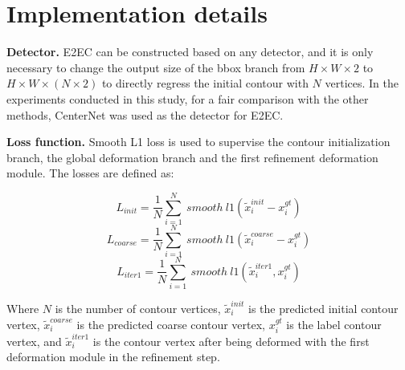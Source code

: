 \documentclass[10pt,twocolumn,letterpaper]{article}
\begin{document}
\section{Implementation details}
\textbf{Detector.} E2EC can be constructed based on any detector, and it is only necessary to change the output size of the bbox branch from $H\times W\times 2$ to $H\times W\times (N\times 2)$ to directly regress the initial contour with $N$ vertices. In the experiments conducted in this study, for a fair comparison with the other methods, CenterNet \cite{centernet} was used as the detector for E2EC.

\textbf{Loss function.} Smooth L1 loss is used to supervise the contour initialization branch, the global deformation branch and the first refinement deformation module. The losses are defined as:\vspace{-3mm}
\begin{small}
\begin{equation}
L_{init}=\frac{1}{N} \sum_{i=1}^{N}\ smooth\ l1(\tilde{x}_{i}^{init} - x_{i}^{gt}) \label{eq6}
\end{equation}\vspace{-3mm}
\begin{equation}
L_{coarse}=\frac{1}{N} \sum_{i=1}^{N}\ smooth\ l1(\tilde{x}_{i}^{coarse} - x_{i}^{gt}) \label{eq7}
\end{equation}
\begin{equation}
L_{iter1} = \frac{1}{N} \sum_{i=1}^{N}\ smooth\ l1(\tilde{x}_{i}^{iter1}, x_{i}^{gt}) \label{eq9}
\end{equation}
\end{small}Where $N$ is the number of contour vertices, $\tilde{x}_{i}^{init}$ is the predicted initial contour vertex, $\tilde{x}_{i}^{coarse}$ is the predicted coarse contour vertex, $x_{i}^{gt}$ is the label contour vertex, and $\tilde{x}_{i}^{iter1}$ is the contour vertex after being deformed with the first deformation module in the refinement step.
\end{document}
